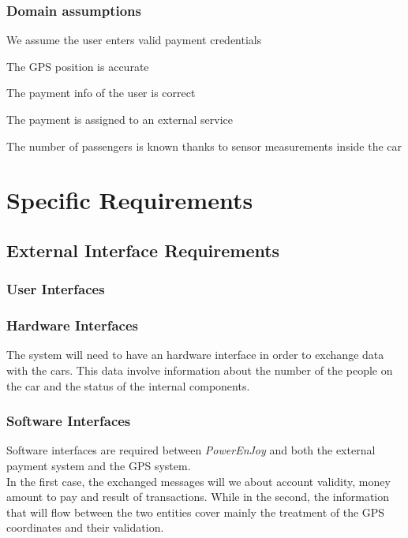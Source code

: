 \documentclass[11pt,a4paper]{report}
\begin{document}
\subsection{Domain assumptions}
\begin{DA}
	\item We assume the user enters valid payment credentials
	\item The GPS position is accurate
	\item The payment info of the user is correct
	\item The payment is assigned to an external service
	\item The number of passengers is known thanks to sensor measurements inside the car
\end{DA}
\chapter{Specific Requirements}
\section{External Interface Requirements}
\subsection{User Interfaces}
\subsection{Hardware Interfaces}
The system will need to have an hardware interface in order to exchange data with the cars. This data involve information about the number of the people on the car and the status of the internal components.
\subsection{Software Interfaces}
Software interfaces are required between \textit{PowerEnJoy} and both the external payment system and the GPS system.\\
In the first case, the exchanged messages will we about account validity, money amount to pay and result of transactions. While in the second, the information that will flow between the two entities cover mainly the treatment of the GPS coordinates and their validation.
\end{document}
